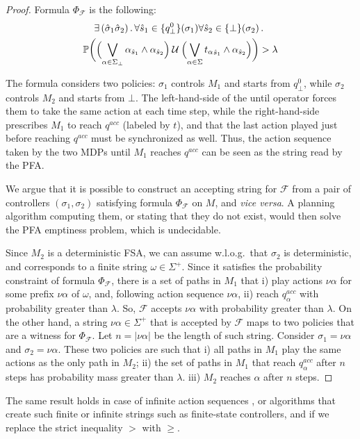 \begin{proof}
Formula $\Phi_\mathcal{F}$ is the following:
\begin{multline*}
\label{undec-formula}
\exists \, (\hat{\sigma}_1 \hat{\sigma}_2) \, . \, \forall {\hat{s}}_{1} \in \{q^0_\bot \} (\sigma_1) \forall {\hat{s}}_{2}\in \{ \bot \}(\sigma_2)  \, . \, \,  \\
\mathbb{P} \biggl( \Bigl( \bigvee_{\alpha \in \Sigma_{\bot}} \alpha_{{\hat{s}}_{1}} \land \alpha_{{\hat{s}}_{2}} \Bigr) \mathbin{\mathcal{U}} \Bigl( \bigvee_{\alpha \in \Sigma} {t_\alpha}_{{\hat{s}}_{1}} \land {\alpha}_{{\hat{s}}_{2}} \Bigr) \biggr) > \lambda
\end{multline*}

The formula considers two policies:
$\sigma_1$ controls $M_1$ and starts from $q^0_\bot$,
while $\sigma_2$ controls $M_2$ and starts from $\bot$.
The left-hand-side of the until operator forces them to take the same action at each time step,
while the right-hand-side prescribes 
$M_1$ to reach $q^\mathit{acc}$ (labeled by $t$), and that the last action played just before reaching $q^\mathit{acc}$ must be synchronized as well.
Thus, the action sequence taken by the two \acp{MDP} until $M_1$ reaches $q^\mathit{acc}$
can be seen as the string read by the \ac{PFA}.

We argue that it is possible to construct an accepting string for $\mathcal{F}$
from a pair of controllers $(\sigma_1, \sigma_2)$ satisfying formula $\Phi_\mathcal{F}$ on $M$, and \emph{vice versa}.
A planning algorithm computing them, or stating that they do not exist, 
would then solve the \ac{PFA} emptiness problem, which is undecidable.

Since $M_2$ is a deterministic \ac{FSA}, 
we can assume w.l.o.g.\ that $\sigma_2$ is deterministic, 
and corresponds to a finite string $\omega \in \Sigma^{+}$.
Since it satisfies the probability constraint of formula $\Phi_\mathcal{F}$,
there is a set of paths in $M_1$ that 
i) play actions $\nu \alpha$ for some prefix $\nu \alpha$ of $\omega$, and, following action sequence $\nu \alpha$, ii) reach $q^\mathit{acc}_{\alpha}$  with probability greater than $\lambda$. 
So, $\mathcal{F}$ accepts $\nu \alpha$ with probability greater than $\lambda$.
On the other hand, a string $\nu \alpha \in \Sigma^{+}$ 
that is accepted by $\mathcal{F}$ maps to two policies that are a witness for $\Phi_\mathcal{F}$.
Let $n = |\nu \alpha|$ be the length of such string.
Consider $\sigma_1 = \nu \alpha$ and $\sigma_2 = \nu\alpha$. 
These two policies are such that 
i) all paths in $M_1$ play the same actions as the only path in $M_2$; 
ii) the set of paths in $M_1$ that reach $q^\mathit{acc}_{\alpha}$ after $n$ steps has probability mass greater than $\lambda$.
iii) $M_2$ reaches $\alpha$ after $n$ steps. 
\end{proof}
The same result holds in case of infinite action sequences , or algorithms that create such finite or infinite strings such as finite-state controllers, and if we replace the strict inequality $>$ with $\geq$.
